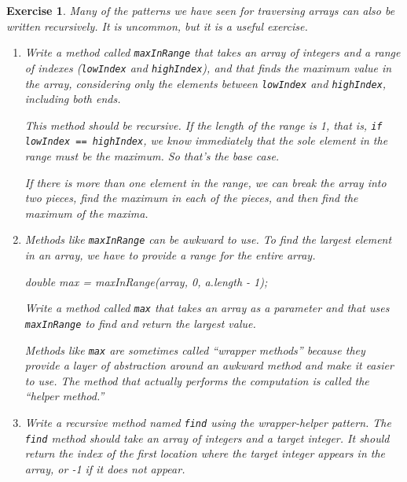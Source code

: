 \documentclass[12pt]{book}
\theoremstyle{exercise}
\newtheorem{exercise}{Exercise}[chapter]
\newcommand{\java}[1]{\verb"#1"}
\newcommand{\java}[1]{\lstinline{#1}} %
\begin{document}
\begin{exercise}
Many of the patterns we have seen for traversing arrays can also be written recursively.
It is uncommon, but it is a useful exercise.

\begin{enumerate}

\item Write a method called \java{maxInRange} that takes an array of integers and a range of indexes (\java{lowIndex} and \java{highIndex}), and that finds the maximum value in the array, considering only the elements between \java{lowIndex} and \java{highIndex}, including both ends.

This method should be recursive.
If the length of the range is 1, that is, \java{if lowIndex == highIndex}, we know immediately that the sole element in the range must be the maximum.
So that's the base case.

If there is more than one element in the range, we can break the array into two pieces, find the maximum in each of the pieces, and then find the maximum of the maxima.

\item Methods like \java{maxInRange} can be awkward to use.
To find the largest element in an array, we have to provide a range for the entire array.

\begin{code}
    double max = maxInRange(array, 0, a.length - 1);
\end{code}

Write a method called \java{max} that takes an array as a parameter and that uses \java{maxInRange} to find and return the largest value.

Methods like \java{max} are sometimes called ``wrapper methods'' because they provide a layer of abstraction around an awkward method and make it easier to use.
The method that actually performs the computation is called the ``helper method.''

\item Write a recursive method named \java{find} using the wrapper-helper pattern.
The \java{find} method should take an array of integers and a target integer.
It should return the index of the first location where the target integer appears in the array, or -1 if it does not appear.

\end{enumerate}
\end{exercise}
\end{document}
